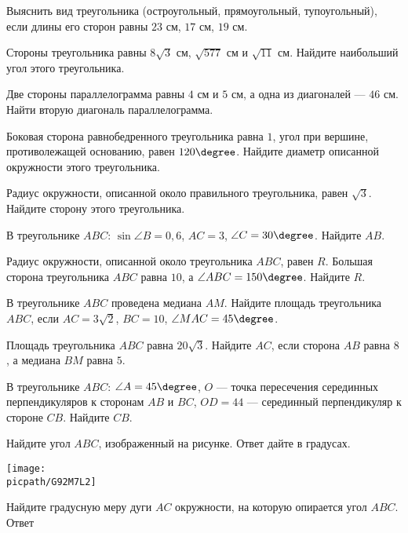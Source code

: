 \begin{class}[number=2]
	\begin{listofex}
		\item Выяснить вид треугольника (остроугольный, прямоугольный, тупоугольный), если длины его сторон равны \( 23 \) см, \( 17 \) см, \( 19 \) см. 
		\item Стороны треугольника равны \( 8\sqrt{3} \) см, \( \sqrt{577} \) см и \( \sqrt{11} \) см. Найдите наибольший угол	этого треугольника. 
		\item Две стороны параллелограмма равны \( 4 \) см и \( 5 \) см, а одна из диагоналей --- \( 46 \)
		см. Найти вторую диагональ параллелограмма.
		\item Боковая сторона равнобедренного треугольника равна \( 1 \), угол при вершине, противолежащей основанию, равен \( 120\degree \). Найдите диаметр описанной окружности этого треугольника.
		\item Радиус окружности, описанной около правильного треугольника, равен \( \sqrt{3} \). Найдите сторону этого треугольника.
		\item В треугольнике \( ABC \): \( \sin\angle B=0,6 \), \( AC=3 \), \( \angle C=30\degree \). Найдите \( AB \).
		\item Радиус окружности, описанной около треугольника \( ABC \), равен \( R \). Большая сторона треугольника \( ABC \) равна \( 10 \), а \( \angle ABC=150\degree \). Найдите \( R \).
		\item В треугольнике \( ABC \) проведена медиана \( AM \). Найдите площадь треугольника \( ABC \), если \( AC=3\sqrt{2} \), \( BC=10 \), \( \angle MAC=45\degree \).
		\item Площадь треугольника \( ABC \) равна \( 20\sqrt{3} \). Найдите \( AC \), если сторона \( AB \) равна \( 8 \), а медиана \( BM \) равна \( 5 \).
		\item В треугольнике \( ABC \): \( \angle A=45\degree \), \( O \) --- точка пересечения серединных перпендикуляров к сторонам \( AB \) и \( BC \), \( OD=44 \) --- серединный перпендикуляр к стороне \( CB \). Найдите \( CB \).
		\item Найдите угол \( ABC \), изображенный на рисунке. Ответ дайте в градусах.
		\begin{center}
			\texttt{[image: \\picpath/G92M7L2]}
		\end{center}
		\item Найдите градусную меру дуги \( AC \) окружности, на которую опирается угол \( ABC \). Ответ

\end{listofex}
\end{class}
